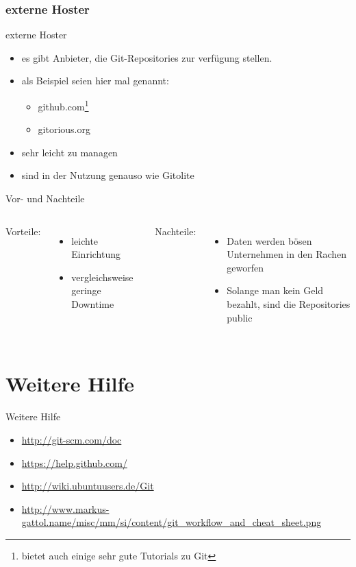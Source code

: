 \documentclass{beamer}
\begin{document}
\subsubsection{externe Hoster}
\begin{frame}{externe Hoster}
	\begin{itemize}
		\item es gibt Anbieter, die Git-Repositories zur verfügung stellen.
		\item als Beispiel seien hier mal genannt:
			\begin{itemize}
				\item github.com\footnote{bietet auch einige sehr gute Tutorials zu Git}
				\item gitorious.org
			\end{itemize}
		\item sehr leicht zu managen
		\item sind in der Nutzung genauso wie Gitolite
	\end{itemize}
\end{frame}

\begin{frame}{Vor- und Nachteile}
	\begin{columns}[c]
		Vorteile:
		\begin{itemize}
			\item leichte Einrichtung
			\item vergleichsweise geringe Downtime
		\end{itemize}
		Nachteile:
		\begin{itemize}
			\item Daten werden bösen Unternehmen in den Rachen geworfen
			\item Solange man kein Geld bezahlt, sind die Repositories public
		\end{itemize}
	\end{columns}
\end{frame}

\section{Weitere Hilfe}
\begin{frame}{Weitere Hilfe}
	\begin{itemize}
		\item \url{http://git-scm.com/doc}
		\item \url{https://help.github.com/}
		\item \url{http://wiki.ubuntuusers.de/Git}
		\item \url{http://www.markus-gattol.name/misc/mm/si/content/git_workflow_and_cheat_sheet.png}
	\end{itemize}
\end{frame}
\end{document}
